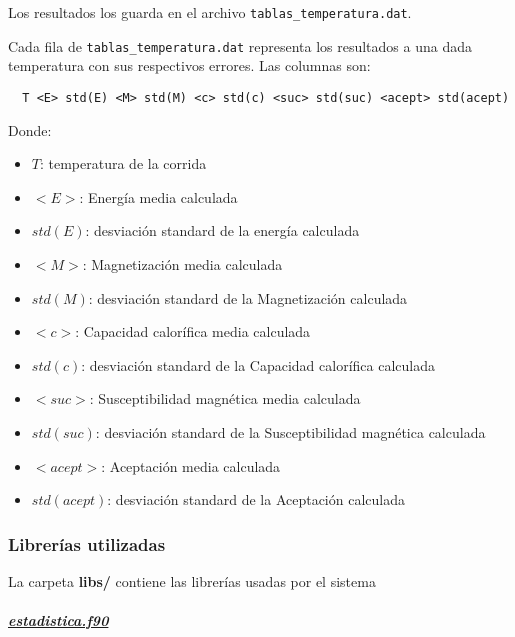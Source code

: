 Los resultados los guarda en el archivo \texttt{tablas\_temperatura.dat}.

Cada fila de \texttt{tablas\_temperatura.dat} representa los resultados a una 
dada temperatura con sus respectivos errores. Las columnas son:

\begin{verbatim}
  T <E> std(E) <M> std(M) <c> std(c) <suc> std(suc) <acept> std(acept)
\end{verbatim}

Donde:



\begin{itemize}
  \item $T$: temperatura de la corrida 
    \item $<E>$: Energ\'ia media calculada
    \item  $std(E)$: desviaci\'on standard de la energ\'ia calculada

    \item $<M>$: Magnetizaci\'on media calculada
    \item  $std(M)$: desviaci\'on standard de la Magnetizaci\'on calculada


    \item $<c>$: Capacidad calor\'ifica media calculada
    \item  $std(c)$: desviaci\'on standard de la Capacidad calor\'ifica calculada

    \item $<suc>$: Susceptibilidad magn\'etica media calculada
    \item  $std(suc)$: desviaci\'on standard de la Susceptibilidad magn\'etica calculada


    \item $<acept>$: Aceptaci\'on media calculada
    \item  $std(acept)$: desviaci\'on standard de la Aceptaci\'on calculada
\end{itemize}


\subsubsection{Librer\'ias utilizadas}

La carpeta \textbf{libs/} contiene las librer\'ias usadas por el sistema

\paragraph{\underline{\textit{estadistica.f90}}}

